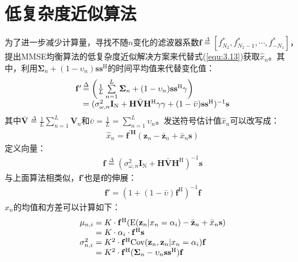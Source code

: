 \section{低复杂度近似算法}
为了进一步减少计算量，寻找不随$n$变化的滤波器系数$\mathbf{f}\overset{\Delta}{=}[f_{N_2}^*,f_{N_2-1}^*,\cdots,f_{-N_1}^*]$，提出MMSE均衡算法的低复杂度近似解决方案来代替式(\ref{equ:3.13})获取$\hat{x}_n$。其中，利用$\boldsymbol{\Sigma}_n+(1-\upsilon_n)\mathbf{s}\mathbf{s}^{\mathrm{H}}$的时间平均值来代替变化值：
\begin{eqnarray}
    \begin{array}{l@{\,}l}
        {\mathbf{f}}'&\overset{\Delta}{=}\left(\frac{1}{L}\sum\limits_{n=1}^{L}\boldsymbol{\Sigma}_n+(1-\upsilon_n)\mathbf{s}\mathbf{s}^{\mathrm{H}}\gamma\right)\\
        &=(\sigma_{\omega,n}^2\mathbf{I}_{\mathrm{N}}+\mathbf{H}\bar{\mathbf{V}}\mathbf{H}^{\mathrm{H}}\gamma\gamma+(1-\bar{\upsilon})\mathbf{s}\mathbf{s}^{\mathrm{H}})^{-1}\mathbf{s}
    \end{array}
    \label{equ:3.30}
\end{eqnarray}
其中$\bar{\mathbf{V}}\overset{\Delta}{=}\frac{1}{L}\sum_{n=1}^L\mathbf{V}_n$和$\bar{\upsilon}=\frac{1}{L}=\sum_{n=1}^L\upsilon_n$。发送符号估计值$\hat{x}_n$可以改写成：
\begin{eqnarray}
    \hat{x}_n=\mathbf{f}^{'\mathbf{H}}(\mathbf{z}_n-\bar{\mathbf{z}}_n+\bar{x}_n\mathbf{s})
    \label{equ:3.31}
\end{eqnarray}
定义向量：
\begin{eqnarray}
    \mathbf{f}\overset{\Delta}{=}(\sigma_{\omega,n}^2\mathbf{I}_{\mathrm{N}}+\mathbf{H}\bar{\mathbf{V}}\mathbf{H}^{\mathrm{H}})^{-1}\mathbf{s}
    \label{equ:3.32}
\end{eqnarray}
与上面算法相类似，${\mathbf{f}}'$也是$\mathbf{f}$的伸展：
\begin{eqnarray}
    {\mathbf{f}}'=(1+(1-\bar{\upsilon})\mathbf{f}^{\mathrm{H}})^{-1}\mathbf{f}
    \label{equ:3.33}
\end{eqnarray}
$\hat{x}_n$的均值和方差可以计算如下：
\begin{eqnarray}
    \begin{array}{l@{\;=\;}l}
        \mu_{n,i}&K\cdot\mathbf{f}^{\mathrm{H}}(\mathrm{E}(\mathbf{z}_n|x_n=\alpha_i)-\bar{\mathbf{z}}_n+\bar{x}_n\mathbf{s})\\
        &K\cdot\alpha_i\cdot\mathbf{f}^{\mathrm{H}}\mathbf{s}\\
        \sigma_{n,i}^2&K^2\cdot\mathbf{f}^{\mathrm{H}}\mathrm{Cov}(\mathbf{z}_n,\mathbf{z}_n|x_n=\alpha_i)\mathbf{f}\\
        &K^2\cdot\mathbf{f}^{\mathrm{H}}(\boldsymbol{\Sigma}_n-\upsilon_n\mathbf{s}\mathbf{s}^{\mathrm{H}})\mathbf{f}
    \end{array}
    \label{equ:3.34}
\end{eqnarray}
